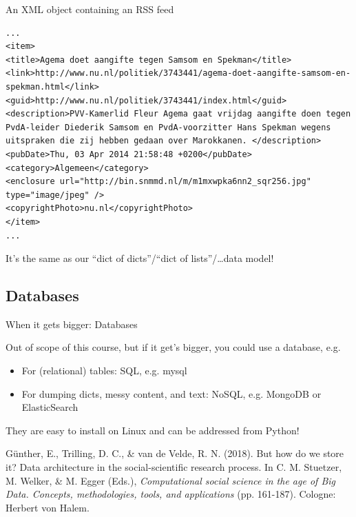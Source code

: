 \documentclass{beamer}
\begin{document}
{\begin{frame}[fragile]{An XML object containing an RSS feed}
\begin{lstlisting}
...
<item>
<title>Agema doet aangifte tegen Samsom en Spekman</title>
<link>http://www.nu.nl/politiek/3743441/agema-doet-aangifte-samsom-en-spekman.html</link>
<guid>http://www.nu.nl/politiek/3743441/index.html</guid>
<description>PVV-Kamerlid Fleur Agema gaat vrijdag aangifte doen tegen PvdA-leider Diederik Samsom en PvdA-voorzitter Hans Spekman wegens uitspraken die zij hebben gedaan over Marokkanen. </description>
<pubDate>Thu, 03 Apr 2014 21:58:48 +0200</pubDate>
<category>Algemeen</category>
<enclosure url="http://bin.snmmd.nl/m/m1mxwpka6nn2_sqr256.jpg" type="image/jpeg" />
<copyrightPhoto>nu.nl</copyrightPhoto>        
</item>
...
\end{lstlisting}
\end{frame}



\begin{frame}{It's the same as our ``dict of dicts''/``dict of lists''/\ldots data model!}
\end{frame}		
		
\subsection{Databases}

\begin{frame}{When it gets bigger: Databases}
\begin{block}{Out of scope of this course, but if it get's bigger, you could use a database, e.g.}
	\begin{itemize}
	\item For (relational) tables: SQL, e.g. mysql
	\item For dumping dicts, messy content, and text: NoSQL, e.g. MongoDB or ElasticSearch
	\end{itemize}
They are easy to install on Linux and can be addressed from Python!
		
\end{block}

\tiny{Günther, E., Trilling, D. C., \& van de Velde, R. N. (2018). But how do we store it? Data architecture in the social-scientific research process. In C. M. Stuetzer, M. Welker, \& M. Egger (Eds.),\textit{ Computational social science in the age of Big Data. Concepts, methodologies, tools, and applications} (pp. 161-187). Cologne: Herbert von Halem.}
\end{frame}

}
\end{document}

